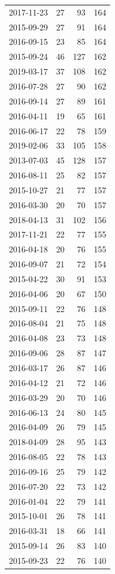 \begin{tabular}{lrrr}
2017-11-23 & 27 & 93 & 164 \\
2015-09-29 & 27 & 91 & 164 \\
2016-09-15 & 23 & 85 & 164 \\
2015-09-24 & 46 & 127 & 162 \\
2019-03-17 & 37 & 108 & 162 \\
2016-07-28 & 27 & 90 & 162 \\
2016-09-14 & 27 & 89 & 161 \\
2016-04-11 & 19 & 65 & 161 \\
2016-06-17 & 22 & 78 & 159 \\
2019-02-06 & 33 & 105 & 158 \\
2013-07-03 & 45 & 128 & 157 \\
2016-08-11 & 25 & 82 & 157 \\
2015-10-27 & 21 & 77 & 157 \\
2016-03-30 & 20 & 70 & 157 \\
2018-04-13 & 31 & 102 & 156 \\
2017-11-21 & 22 & 77 & 155 \\
2016-04-18 & 20 & 76 & 155 \\
2016-09-07 & 21 & 72 & 154 \\
2015-04-22 & 30 & 91 & 153 \\
2016-04-06 & 20 & 67 & 150 \\
2015-09-11 & 22 & 76 & 148 \\
2016-08-04 & 21 & 75 & 148 \\
2016-04-08 & 23 & 73 & 148 \\
2016-09-06 & 28 & 87 & 147 \\
2016-03-17 & 26 & 87 & 146 \\
2016-04-12 & 21 & 72 & 146 \\
2016-03-29 & 20 & 70 & 146 \\
2016-06-13 & 24 & 80 & 145 \\
2016-04-09 & 26 & 79 & 145 \\
2018-04-09 & 28 & 95 & 143 \\
2016-08-05 & 22 & 78 & 143 \\
2016-09-16 & 25 & 79 & 142 \\
2016-07-20 & 22 & 73 & 142 \\
2016-01-04 & 22 & 79 & 141 \\
2015-10-01 & 26 & 78 & 141 \\
2016-03-31 & 18 & 66 & 141 \\
2015-09-14 & 26 & 83 & 140 \\
2015-09-23 & 22 & 76 & 140 \\

\end{tabular}
